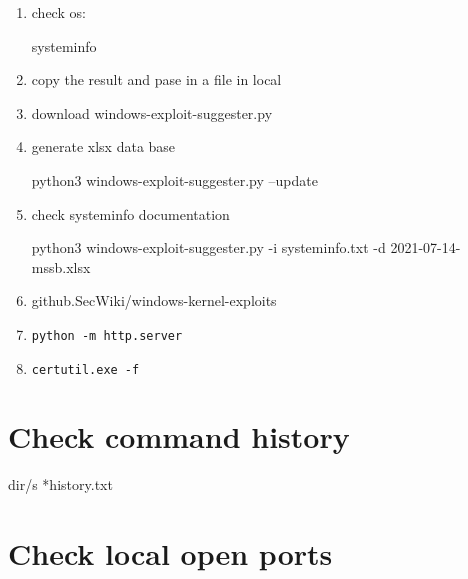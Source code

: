 \documentclass{assets/ipesethesis}
\newenvironment{Shaded}{\begin{snugshade}}{\end{snugshade}}
\newcommand{\ExtensionTok}[1]{#1}
\newcommand{\FunctionTok}[1]{\textcolor[rgb]{0.00,0.00,0.00}{#1}}
\newcommand{\NormalTok}[1]{#1}
\begin{document}
\begin{enumerate}
\def\labelenumi{\arabic{enumi}.}
\item
  check os:

\begin{Shaded}
\begin{Highlighting}[]
\ExtensionTok{systeminfo}
\end{Highlighting}
\end{Shaded}
\item
  copy the result and pase in a file in local
\item
  download windows-exploit-suggester.py
\item
  generate xlsx data base

\begin{Shaded}
\begin{Highlighting}[]
\ExtensionTok{python3}\NormalTok{ windows-exploit-suggester.py --update}
\end{Highlighting}
\end{Shaded}
\item
  check systeminfo documentation

\begin{Shaded}
\begin{Highlighting}[]
\ExtensionTok{python3}\NormalTok{ windows-exploit-suggester.py -i systeminfo.txt -d 2021-07-14-mssb.xlsx}
\end{Highlighting}
\end{Shaded}
\item
  github.SecWiki/windows-kernel-exploits
\item
  \texttt{python\ -m\ http.server}
\item
  \texttt{certutil.exe\ -f}
\end{enumerate}

\hypertarget{check-command-history}{%
\section*{Check command history}\label{check-command-history}}

\begin{Shaded}
\begin{Highlighting}[]
\FunctionTok{dir}\NormalTok{/s *}\FunctionTok{history}\NormalTok{.}\FunctionTok{txt}
\end{Highlighting}
\end{Shaded}

\hypertarget{check-local-open-ports}{%
\section*{Check local open ports}\label{check-local-open-ports}}
\end{document}
